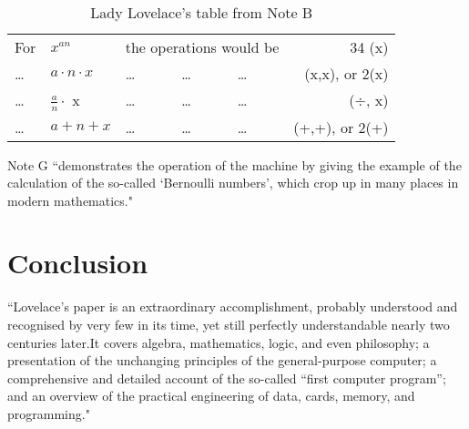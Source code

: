 \documentclass[12pt, xcolor=dvipsnames]{beamer}
\begin{document}
\begin{frame}

\begin{center} 
{\bf \subsecname} \label{bern}
\end{center}

{\footnotesize{
\begin{table}[h]
\centering
\begin{tabular}{lllllr}
For & $x^{an}$ & \multicolumn{3}{c}{the operations would be} & 34 (x)\\
\ldots & $a \cdot n \cdot x$ & \ldots & \ldots & \ldots & (x,x), or 2(x) \\
\ldots & $\frac{a}{n} \cdot$ x & \ldots & \ldots & \ldots & ($\div$, x) \\
\ldots & $a + n + x$ & \ldots & \ldots & \ldots & (+,+), or 2(+) \\
\end{tabular}
\caption{Lady Lovelace's table from Note B \cite{ada}}
\end{table}
}}

Note G ``demonstrates the operation of the machine by giving the example of the calculation of the so-called ‘Bernoulli numbers’, which crop up in many places in modern mathematics." \cite{sciencefocus} \cite{sciencefocusadapted}

\end{frame}

\section{Conclusion}

\begin{frame}

\begin{center} 
{\bf \secname} 
\end{center}

``Lovelace’s paper is an extraordinary accomplishment, probably understood and recognised by very few in its time, yet still perfectly understandable nearly two centuries later.\pause It covers algebra, mathematics, logic, and even philosophy; a presentation of the unchanging principles of the general-purpose computer; a comprehensive and detailed account of the so-called “first computer program”; and an overview of the practical engineering of data, cards, memory, and programming." \cite{bodleian}

\end{frame}
\end{document}
